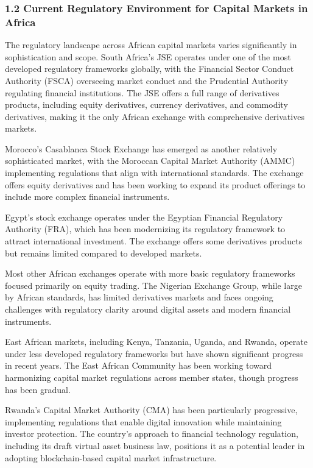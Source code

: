 \documentclass[12pt]{article}
\begin{document}
\subsubsection{1.2 Current Regulatory Environment for Capital Markets in Africa} %

The regulatory landscape across African capital markets varies significantly in sophistication and scope. South Africa's JSE operates under one of the most developed regulatory frameworks globally, with the Financial Sector Conduct Authority (FSCA) overseeing market conduct and the Prudential Authority regulating financial institutions. The JSE offers a full range of derivatives products, including equity derivatives, currency derivatives, and commodity derivatives, making it the only African exchange with comprehensive derivatives markets.

Morocco's Casablanca Stock Exchange has emerged as another relatively sophisticated market, with the Moroccan Capital Market Authority (AMMC) implementing regulations that align with international standards. The exchange offers equity derivatives and has been working to expand its product offerings to include more complex financial instruments.

Egypt's stock exchange operates under the Egyptian Financial Regulatory Authority (FRA), which has been modernizing its regulatory framework to attract international investment. The exchange offers some derivatives products but remains limited compared to developed markets.

Most other African exchanges operate with more basic regulatory frameworks focused primarily on equity trading. The Nigerian Exchange Group, while large by African standards, has limited derivatives markets and faces ongoing challenges with regulatory clarity around digital assets and modern financial instruments.

East African markets, including Kenya, Tanzania, Uganda, and Rwanda, operate under less developed regulatory frameworks but have shown significant progress in recent years. The East African Community has been working toward harmonizing capital market regulations across member states, though progress has been gradual.

Rwanda's Capital Market Authority (CMA) has been particularly progressive, implementing regulations that enable digital innovation while maintaining investor protection. The country's approach to financial technology regulation, including its draft virtual asset business law, positions it as a potential leader in adopting blockchain-based capital market infrastructure.
\end{document}
